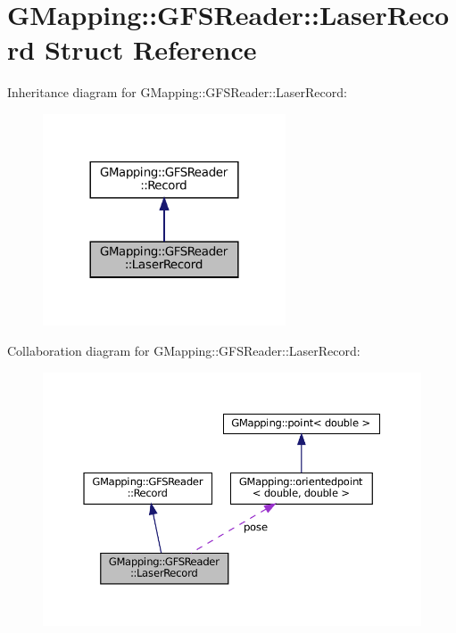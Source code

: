 \hypertarget{structGMapping_1_1GFSReader_1_1LaserRecord}{}\section{G\+Mapping\+:\+:G\+F\+S\+Reader\+:\+:Laser\+Record Struct Reference}
\label{structGMapping_1_1GFSReader_1_1LaserRecord}


Inheritance diagram for G\+Mapping\+:\+:G\+F\+S\+Reader\+:\+:Laser\+Record\+:
\nopagebreak
\begin{figure}[H]
\begin{center}
\leavevmode
\includegraphics[width=204pt]{structGMapping_1_1GFSReader_1_1LaserRecord__inherit__graph}
\end{center}
\end{figure}


Collaboration diagram for G\+Mapping\+:\+:G\+F\+S\+Reader\+:\+:Laser\+Record\+:
\nopagebreak
\begin{figure}[H]
\begin{center}
\leavevmode
\includegraphics[width=350pt]{structGMapping_1_1GFSReader_1_1LaserRecord__coll__graph}
\end{center}
\end{figure}
